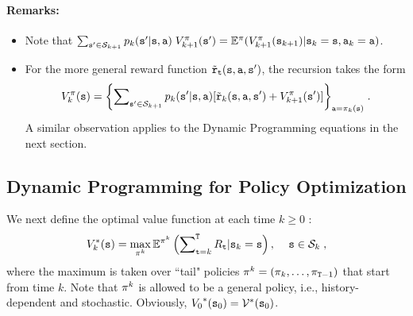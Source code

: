 \paragraph{Remarks:}
\begin{itemize}
  \item Note that $\sum\nolimits_{{\tt s}' \in {\mathcal{S}_{k + 1}}} {{p_k}({\tt s}'|{\tt s},{\tt a})} \;V_{k + 1}^\pi ({\tt s}') = {\mathbb{E}^\pi }(V_{k + 1}^\pi ({{\tt s}_{k + 1}})|{{\tt s}_k} = {\tt s},{{\tt a}_k} = {\tt a})$.
  \item For the more general reward function ${\tilde {{\tt r}}_{\tt t}}({\tt s},{\tt a},{\tt s}')$, the recursion takes the form
                     \[V_k^\pi ({\tt s}) = {\left\{ {\sum\nolimits_{{\tt s}' \in {\mathcal{S}_{k + 1}}} {{p_k}({\tt s}'|{\tt s},{\tt a})} [{\tilde {{\tt r}}_k}({\tt s},{\tt a},{\tt s}') + V_{k + 1}^\pi ({\tt s}')]} \right\}_{{\tt a} = {\pi _k}({\tt s})}}\;.\]
                      A similar observation applies to the Dynamic Programming
equations in the next section.
\end{itemize}

\subsection{Dynamic Programming for Policy Optimization}

We next define the optimal value function at each time $k \ge 0$ :
\[
V_k^{*}({\tt s}) = \mathop {\max }\limits_{{\pi ^k}}
{\mathbb{E}^{{\pi ^k}}}\left( {\sum\nolimits_{{\tt t} = k}^{\tt T}
{{R_{\tt t}}|{{\tt s}_k} = {\tt s}} } \right),\quad \,{\tt s} \in
{\mathcal{S}_k} \;,
\]
where the maximum is taken over ``tail" policies ${\pi ^k} =
({\pi_k}, \ldots ,{\pi _{{\tt T} -1}})$ that start from
time $k$. Note that ${\pi ^k}$ is allowed to be a general
policy, i.e., history-dependent and stochastic. Obviously,
${V_0}^*({{\tt s}_0}) = {\mathcal{V}^*}({{\tt s}_0})$.

